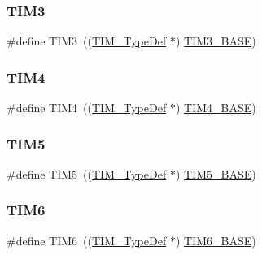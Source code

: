 \subsubsection{\texorpdfstring{TIM3}{TIM3}}
{\footnotesize\ttfamily \#define T\+I\+M3~((\mbox{\hyperlink{struct_t_i_m___type_def}{T\+I\+M\+\_\+\+Type\+Def}} $\ast$) \mbox{\hyperlink{group___peripheral__memory__map_gaf0c34a518f87e1e505cd2332e989564a}{T\+I\+M3\+\_\+\+B\+A\+SE}})}

\mbox{\label{group___peripheral__declaration_ga91a09bad8bdc7a1cb3d85cf49c94c8ec}} 
\subsubsection{\texorpdfstring{TIM4}{TIM4}}
{\footnotesize\ttfamily \#define T\+I\+M4~((\mbox{\hyperlink{struct_t_i_m___type_def}{T\+I\+M\+\_\+\+Type\+Def}} $\ast$) \mbox{\hyperlink{group___peripheral__memory__map_ga56e2d44b0002f316527b8913866a370d}{T\+I\+M4\+\_\+\+B\+A\+SE}})}

\mbox{\label{group___peripheral__declaration_ga5125ff6a23a2ed66e2e19bd196128c14}} 
\subsubsection{\texorpdfstring{TIM5}{TIM5}}
{\footnotesize\ttfamily \#define T\+I\+M5~((\mbox{\hyperlink{struct_t_i_m___type_def}{T\+I\+M\+\_\+\+Type\+Def}} $\ast$) \mbox{\hyperlink{group___peripheral__memory__map_ga3e1671477190d065ba7c944558336d7e}{T\+I\+M5\+\_\+\+B\+A\+SE}})}

\mbox{\label{group___peripheral__declaration_gac7b4ed55f9201b498b38c962cca97314}} 
\subsubsection{\texorpdfstring{TIM6}{TIM6}}
{\footnotesize\ttfamily \#define T\+I\+M6~((\mbox{\hyperlink{struct_t_i_m___type_def}{T\+I\+M\+\_\+\+Type\+Def}} $\ast$) \mbox{\hyperlink{group___peripheral__memory__map_ga8268ec947929f192559f28c6bf7d1eac}{T\+I\+M6\+\_\+\+B\+A\+SE}})}


